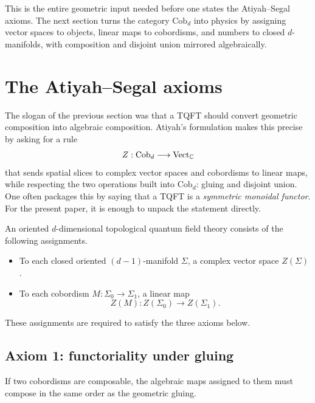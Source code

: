 \medskip

\noindent This is the entire geometric input needed before one states the Atiyah--Segal axioms. The next section turns the category $\mathrm{Cob}_d$ into physics by assigning vector spaces to objects, linear maps to cobordisms, and numbers to closed $d$-manifolds, with composition and disjoint union mirrored algebraically.

\section{The Atiyah--Segal axioms}\label{sec:atiyah-segal-axioms}

The slogan of the previous section was that a TQFT should convert geometric composition into algebraic composition. Atiyah's formulation \cite{Atiyah1988TQFT} makes this precise by asking for a rule
\begin{equation}\label{eq:TQFT-functor}
Z : \mathrm{Cob}_d \longrightarrow \mathrm{Vect}_{\mathbb{C}}
\end{equation}
that sends spatial slices to complex vector spaces and cobordisms to linear maps, while respecting the two operations built into $\mathrm{Cob}_d$: gluing and disjoint union. One often packages this by saying that a TQFT is a \emph{symmetric monoidal functor}. For the present paper, it is enough to unpack the statement directly.

\begin{definition}\label{def:Atiyah-Segal}
An oriented $d$-dimensional topological quantum field theory consists of the following assignments.
\begin{itemize}
\item To each closed oriented $(d-1)$-manifold $\Sigma$, a complex vector space $Z(\Sigma)$.
\item To each cobordism $M : \Sigma_0 \to \Sigma_1$, a linear map
\begin{equation}\label{eq:Z-of-cobordism}
Z(M) : Z(\Sigma_0) \longrightarrow Z(\Sigma_1).
\end{equation}
\end{itemize}
These assignments are required to satisfy the three axioms below.
\end{definition}

\subsection{Axiom 1: functoriality under gluing}

If two cobordisms are composable, the algebraic maps assigned to them must compose in the same order as the geometric gluing.

